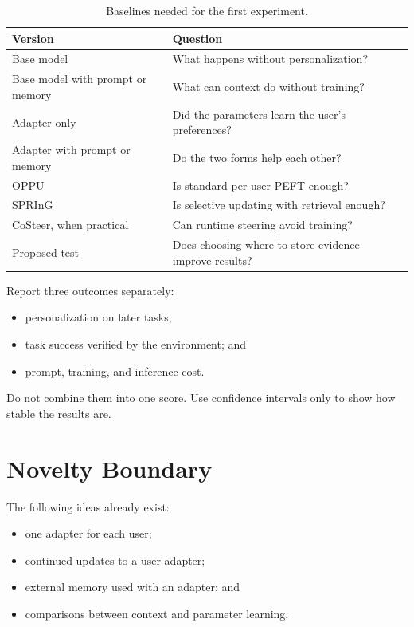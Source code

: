 \documentclass[11pt]{article}
\begin{document}
\begin{table}[ht]
  \centering
  \caption{Baselines needed for the first experiment.}
  \begin{tabularx}{0.94\textwidth}{@{}L{0.32\textwidth}Y@{}}
    \toprule
    Version & Question \\
    \midrule
    Base model & What happens without personalization? \\
    Base model with prompt or memory & What can context do without training? \\
    Adapter only & Did the parameters learn the user's preferences? \\
    Adapter with prompt or memory & Do the two forms help each other? \\
    OPPU & Is standard per-user PEFT enough? \\
    SPRInG & Is selective updating with retrieval enough? \\
    CoSteer, when practical & Can runtime steering avoid training? \\
    Proposed test & Does choosing where to store evidence improve results? \\
    \bottomrule
  \end{tabularx}
\end{table}

Report three outcomes separately:
\begin{itemize}
  \item personalization on later tasks;
  \item task success verified by the environment; and
  \item prompt, training, and inference cost.
\end{itemize}
Do not combine them into one score. Use confidence intervals only to show how
stable the results are.

\section{Novelty Boundary}

The following ideas already exist:
\begin{itemize}
  \item one adapter for each user;
  \item continued updates to a user adapter;
  \item external memory used with an adapter; and
  \item comparisons between context and parameter learning.
\end{itemize}
\end{document}
